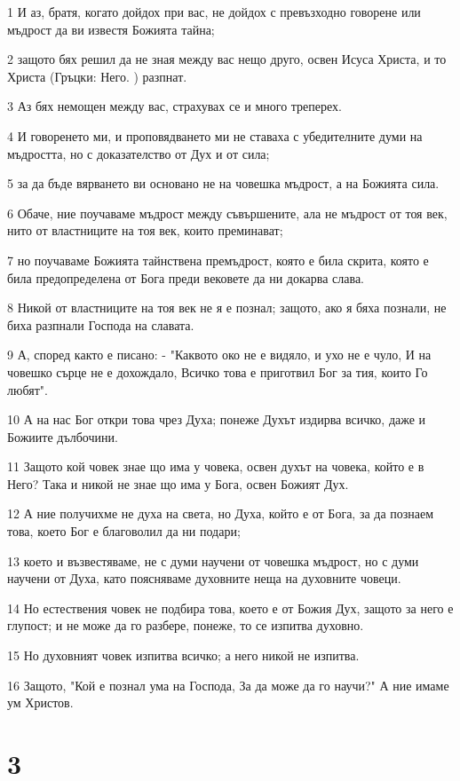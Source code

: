 \par 1 И аз, братя, когато дойдох при вас, не дойдох с превъзходно говорене или мъдрост да ви известя Божията тайна;
\par 2 защото бях решил да не зная между вас нещо друго, освен Исуса Христа, и то Христа (Гръцки: Него. ) разпнат.
\par 3 Аз бях немощен между вас, страхувах се и много треперех.
\par 4 И говоренето ми, и проповядването ми не ставаха с убедителните думи на мъдростта, но с доказателство от Дух и от сила;
\par 5 за да бъде вярването ви основано не на човешка мъдрост, а на Божията сила.
\par 6 Обаче, ние поучаваме мъдрост между съвършените, ала не мъдрост от тоя век, нито от властниците на тоя век, които преминават;
\par 7 но поучаваме Божията тайнствена премъдрост, която е била скрита, която е била предопределена от Бога преди вековете да ни докарва слава.
\par 8 Никой от властниците на тоя век не я е познал; защото, ако я бяха познали, не биха разпнали Господа на славата.
\par 9 А, според както е писано: - "Каквото око не е видяло, и ухо не е чуло, И на човешко сърце не е дохождало, Всичко това е приготвил Бог за тия, които Го любят".
\par 10 А на нас Бог откри това чрез Духа; понеже Духът издирва всичко, даже и Божиите дълбочини.
\par 11 Защото кой човек знае що има у човека, освен духът на човека, който е в Него? Така и никой не знае що има у Бога, освен Божият Дух.
\par 12 А ние получихме не духа на света, но Духа, който е от Бога, за да познаем това, което Бог е благоволил да ни подари;
\par 13 което и възвестяваме, не с думи научени от човешка мъдрост, но с думи научени от Духа, като поясняваме духовните неща на духовните човеци.
\par 14 Но естествения човек не подбира това, което е от Божия Дух, защото за него е глупост; и не може да го разбере, понеже, то се изпитва духовно.
\par 15 Но духовният човек изпитва всичко; а него никой не изпитва.
\par 16 Защото, "Кой е познал ума на Господа, За да може да го научи?" А ние имаме ум Христов.

\chapter{3}

